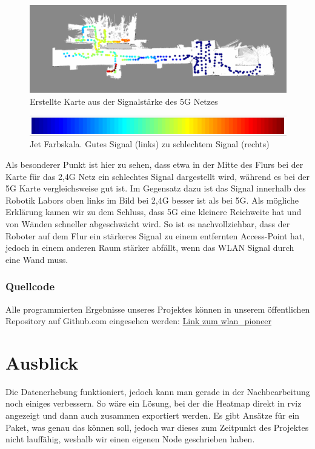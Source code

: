 \documentclass{scrartcl}%
\begin{document}
\begin{figure}[h!]
	\centering
	\includegraphics[width=\textwidth]{bilder/wlan-heatmap-5G.png}
	\caption{Erstellte Karte aus der Signalstärke des 5G Netzes}
	\label{5g}
\end{figure}

\begin{figure}[h!]
	\centering
	\includegraphics[width=\textwidth]{bilder/JetFarbskala.png}
	\caption{Jet Farbskala. Gutes Signal (links) zu schlechtem Signal (rechts)}
	\label{skala}
\end{figure}

Als besonderer Punkt ist hier zu sehen, dass etwa in der Mitte des Flurs bei der Karte für das 2,4G Netz ein schlechtes Signal dargestellt wird, während es bei der 5G Karte vergleichsweise gut ist. Im Gegensatz dazu ist das Signal innerhalb des Robotik Labors oben links im Bild bei 2,4G besser ist als bei 5G. Als mögliche Erklärung kamen wir zu dem Schluss, dass 5G eine kleinere Reichweite hat und von Wänden schneller abgeschwächt wird. So ist es nachvollziehbar, dass der Roboter auf dem Flur ein stärkeres Signal zu einem entfernten Access-Point hat, jedoch in einem anderen Raum stärker abfällt, wenn das WLAN Signal durch eine Wand muss.

\subsubsection{Quellcode}
Alle programmierten Ergebnisse unseres Projektes können in unserem öffentlichen Repository auf Github.com eingesehen werden: \href{https://github.com/fzirker/wlan_pioneer}{Link zum wlan\_pioneer}

\newpage
\section{Ausblick}
Die Datenerhebung funktioniert, jedoch kann man gerade in der Nachbearbeitung noch einiges verbessern. So wäre ein Lösung, bei der die Heatmap direkt in rviz angezeigt und dann auch zusammen exportiert werden. Es gibt Ansätze für ein Paket, was genau das können soll, jedoch war dieses zum Zeitpunkt des Projektes nicht lauffähig, weshalb wir einen eigenen Node geschrieben haben.
\end{document}
